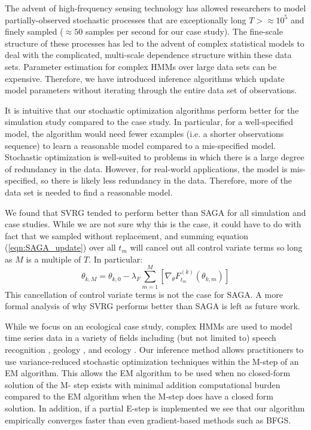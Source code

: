 
The advent of high-frequency sensing technology has allowed researchers to model partially-observed stochastic processes that are exceptionally long $T > \approx 10^5$ and finely sampled ($\approx 50$ samples per second for our case study). The fine-scale structure of these processes has led to the advent of complex statistical models to deal with the complicated, multi-scale dependence structure within these data sets. Parameter estimation for complex HMMs over large data sets can be expensive. Therefore, we have introduced inference algorithms which update model parameters without iterating through the entire data set of observations.

It is intuitive that our stochastic optimization algorithms perform better for the simulation study compared to the case study. In particular, for a well-specified model, the algorithm would need fewer examples (i.e. a shorter observations sequence) to learn a reasonable model compared to a mis-specified model. Stochastic optimization is well-suited to problems in which there is a large degree of redundancy in the data. However, for real-world applications, the model is mis-specified, so there is likely less redundancy in the data. Therefore, more of the data set is needed to find a reasonable model.

We found that SVRG tended to perform better than SAGA for all simulation and case studies. While we are not sure why this is the case, it could have to do with fact that we sampled without replacement, and summing equation (\ref{eqn:SAGA_update}) over all $t_m$ will cancel out all control variate terms so long as $M$ is a multiple of $T$. In particular:
%
\begin{equation}
    \theta_{k,M} = \theta_{k,0} - \lambda_F \sum_{m=1}^{M} \left[\nabla_\theta F^{(k)}_{t_m}(\theta_{k,m})\right]
\end{equation}
%
This cancellation of control variate terms is not the case for SAGA. A more formal analysis of why SVRG performs better than SAGA is left as future work.

While we focus on an ecological case study, complex HMMs are used to model time series data in a variety of fields including (but not limited to) speech recognition \citep{Gales:2008}, geology \citep{Bebbington:2007}, and ecology \citep{McClintock:2020}. Our inference method allows practitioners to use variance-reduced stochastic optimization techniques within the M-step of an EM algorithm. This allows the EM algorithm to be used when no closed-form solution of the M- step exists with minimal addition computational burden compared to the EM algorithm when the M-step does have a closed form solution. In addition, if a partial E-step is implemented we see that our algorithm empirically converges faster than even gradient-based methods such as BFGS.

